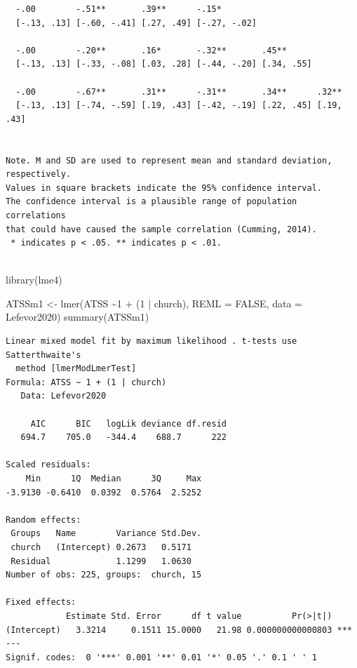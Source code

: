 \documentclass[
  english,
]{book}
\newenvironment{Shaded}{\begin{snugshade}}{\end{snugshade}}
\newcommand{\AttributeTok}[1]{\textcolor[rgb]{0.77,0.63,0.00}{#1}}
\newcommand{\ConstantTok}[1]{\textcolor[rgb]{0.00,0.00,0.00}{#1}}
\newcommand{\DecValTok}[1]{\textcolor[rgb]{0.00,0.00,0.81}{#1}}
\newcommand{\FunctionTok}[1]{\textcolor[rgb]{0.00,0.00,0.00}{#1}}
\newcommand{\NormalTok}[1]{#1}
\newcommand{\OtherTok}[1]{\textcolor[rgb]{0.56,0.35,0.01}{#1}}
\newcommand{\SpecialCharTok}[1]{\textcolor[rgb]{0.00,0.00,0.00}{#1}}
\begin{document}
\begin{verbatim}
  -.00        -.51**       .39**      -.15*                             
  [-.13, .13] [-.60, -.41] [.27, .49] [-.27, -.02]                      
                                                                        
  -.00        -.20**       .16*       -.32**       .45**                
  [-.13, .13] [-.33, -.08] [.03, .28] [-.44, -.20] [.34, .55]           
                                                                        
  -.00        -.67**       .31**      -.31**       .34**      .32**     
  [-.13, .13] [-.74, -.59] [.19, .43] [-.42, -.19] [.22, .45] [.19, .43]
                                                                        

Note. M and SD are used to represent mean and standard deviation, respectively.
Values in square brackets indicate the 95% confidence interval.
The confidence interval is a plausible range of population correlations 
that could have caused the sample correlation (Cumming, 2014).
 * indicates p < .05. ** indicates p < .01.
 
\end{verbatim}

\begin{Shaded}
\begin{Highlighting}[]
\FunctionTok{library}\NormalTok{(lme4)}

\NormalTok{ATSSm1 }\OtherTok{\textless{}{-}} \FunctionTok{lmer}\NormalTok{(ATSS }\SpecialCharTok{\textasciitilde{}}\DecValTok{1} \SpecialCharTok{+}\NormalTok{ (}\DecValTok{1} \SpecialCharTok{|}\NormalTok{ church), }\AttributeTok{REML =} \ConstantTok{FALSE}\NormalTok{, }\AttributeTok{data =}\NormalTok{ Lefevor2020)}
\FunctionTok{summary}\NormalTok{(ATSSm1)}
\end{Highlighting}
\end{Shaded}

\begin{verbatim}
Linear mixed model fit by maximum likelihood . t-tests use Satterthwaite's
  method [lmerModLmerTest]
Formula: ATSS ~ 1 + (1 | church)
   Data: Lefevor2020

     AIC      BIC   logLik deviance df.resid 
   694.7    705.0   -344.4    688.7      222 

Scaled residuals: 
    Min      1Q  Median      3Q     Max 
-3.9130 -0.6410  0.0392  0.5764  2.5252 

Random effects:
 Groups   Name        Variance Std.Dev.
 church   (Intercept) 0.2673   0.5171  
 Residual             1.1299   1.0630  
Number of obs: 225, groups:  church, 15

Fixed effects:
            Estimate Std. Error      df t value          Pr(>|t|)    
(Intercept)   3.3214     0.1511 15.0000   21.98 0.000000000000803 ***
---
Signif. codes:  0 '***' 0.001 '**' 0.01 '*' 0.05 '.' 0.1 ' ' 1
\end{verbatim}
\end{document}
